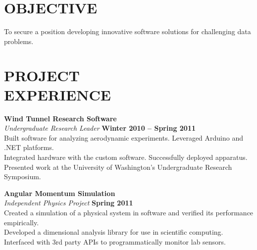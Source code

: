 \documentclass[margin,line]{resume}
\begin{document}
\begin{resume}
    \section{\mysidestyle \textbf{\large{O}\small{BJECTIVE}}}

    To secure a position developing innovative software solutions for challenging data problems.\vspace{-3mm}\\\vspace{-1mm}%

\sectionline

    \section{\mysidestyle \textbf{\large{P}\small{ROJECT\\EXPERIENCE}}}

    \textbf{\listing Wind Tunnel Research Software} \vspace{2mm}\\\vspace{1mm}%
    \textsl{Undergraduate Research Leader} \hfill \textbf{Winter 2010 -- Spring 2011}\\
    Built software for analyzing aerodynamic experiments. Leveraged Arduino and .NET platforms.\\
    Integrated hardware with the custom software. Successfully deployed apparatus.\\
    Presented work at the University of Washington's Undergraduate Research Symposium.

    \textbf{\listing Angular Momentum Simulation} \vspace{2mm}\\\vspace{1mm}%
    \textsl{Independent Physics Project} \hfill \textbf{Spring 2011}\\
    Created a simulation of a physical system in software and verified its performance empirically.\\
    Developed a dimensional analysis library for use in scientific computing.\\
    Interfaced with 3rd party APIs to programmatically monitor lab sensors.


\end{resume}
\end{document}
